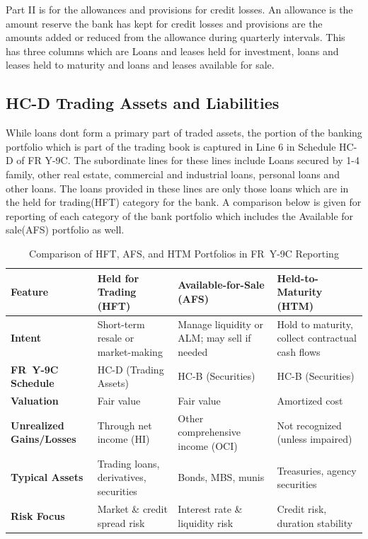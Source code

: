\documentclass[conference]{IEEEtran}
\begin{document}
    Part II is for the allowances and provisions for credit losses. An allowance is the amount reserve the bank has kept for credit losses and provisions are the amounts added or reduced from the allowance during quarterly intervals. This has three columns which are Loans and leases held for investment, loans and leases held to maturity and loans and leases available for sale.
    
    \subsection{HC-D Trading Assets and Liabilities}
	While loans dont form a primary part of traded assets, the portion of the banking portfolio which is part of the trading book is captured in Line 6 in Schedule HC-D of FR Y-9C. The subordinate lines for these lines include Loans secured by 1-4 family, other real estate, commercial and industrial loans, personal loans and other loans. The loans provided in these lines are only those loans which are in the held for trading(HFT) category for the bank. A comparison below is given for reporting of each category of the bank portfolio which includes the Available for sale(AFS) portfolio as well.
	
	\begin{table}[htbp]
		\centering
		\caption{Comparison of HFT, AFS, and HTM Portfolios in FR~Y-9C Reporting}
		\begin{tabular}{|p{1.3cm}|p{2.1cm}|p{2.1cm}|p{2.1cm}|}
			\hline
			\textbf{Feature} & \textbf{Held for Trading (HFT)} & \textbf{Available-for-Sale (AFS)} & \textbf{Held-to-Maturity (HTM)} \\
			\hline
			\textbf{Intent} & {Short-term resale or market-making} & {Manage liquidity or ALM; may sell if needed} & {Hold to maturity, collect contractual cash flows} \\
			\hline
			\textbf{FR~Y-9C Schedule} & {HC-D (Trading Assets)} & {HC-B (Securities)} & {HC-B (Securities)} \\
			\hline
			\textbf{Valuation} & {Fair value} & {Fair value} & {Amortized cost} \\
			\hline
			\textbf{Unrealized Gains/Losses} & {Through net income (HI)} & {Other comprehensive income (OCI)} & {Not recognized (unless impaired)} \\
			\hline
			\textbf{Typical Assets} & {Trading loans, derivatives, securities} & {Bonds, MBS, munis} & {Treasuries, agency securities} \\
			\hline
			\textbf{Risk Focus} & {Market \& credit spread risk} & {Interest rate \& liquidity risk} & {Credit risk, duration stability} \\
			\hline
		\end{tabular}
	\end{table}
	
\end{document}
